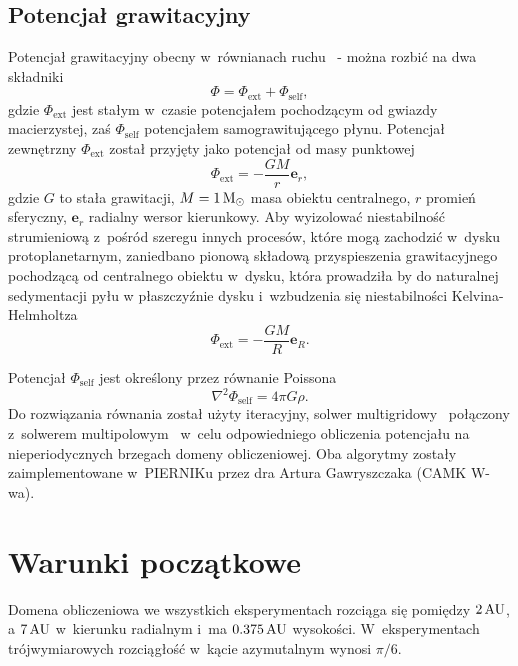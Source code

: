 \subsection{Potencjał grawitacyjny}
Potencjał grawitacyjny obecny w~równianach ruchu~ -  można
rozbić na dwa składniki
\begin{equation}
   \Phi = \Phi_{\textrm{ext}} + \Phi_{\textrm{self}},
\end{equation}
gdzie $\Phi_{\textrm{ext}}$ jest stałym w~czasie potencjałem pochodzącym od
gwiazdy macierzystej, zaś $\Phi_{\textrm{self}}$ potencjałem samograwitującego
płynu. Potencjał zewnętrzny $\Phi_{\textrm{ext}}$ został przyjęty jako potencjał
od masy punktowej
\begin{equation}
   \Phi_{\textrm{ext}} = -\frac{GM}{r} \mathbf{e}_r,
\end{equation}
gdzie $G$ to stała grawitacji, $M = 1\hbox{$\mathrm{\thinspace M_{\odot}}$}$ masa obiektu centralnego, $r$
promień sferyczny, $\mathbf{e}_r$ radialny wersor kierunkowy.
Aby wyizolować niestabilność strumieniową z~pośród
szeregu innych procesów, które mogą zachodzić w~dysku protoplanetarnym,
zaniedbano pionową składową przyspieszenia grawitacyjnego pochodzącą od
centralnego obiektu w~dysku, która prowadziła by do naturalnej sedymentacji pyłu
w płaszczyźnie dysku i~wzbudzenia się niestabilności
Kelvina-Helmholtza~\cite{JHK06}
\begin{equation}\label{eq:phiext}
   \Phi_{\textrm{ext}} = -\frac{GM}{R} \mathbf{e}_R.
\end{equation}

\par Potencjał $\Phi_{\textrm{self}}$ jest określony przez równanie Poissona
\begin{equation}\label{eq:poisson}
   \nabla^2 \Phi_{\textrm{self}} = 4\pi G \rho.
\end{equation}
Do rozwiązania równania  został użyty iteracyjny, solwer
multigridowy~\citep{HG00} połączony z~solwerem multipolowym~\citep{J77} w~celu
odpowiedniego obliczenia potencjału na nieperiodycznych brzegach domeny
obliczeniowej. Oba algorytmy zostały zaimplementowane w~PIERNIKu przez dra
Artura Gawryszczaka (CAMK W-wa).

\section{Warunki początkowe}
Domena obliczeniowa we wszystkich eksperymentach rozciąga się pomiędzy $2\hbox{$\thinspace\textrm{AU}$}$, a
$7\hbox{$\thinspace\textrm{AU}$}$ w~kierunku radialnym i~ma $0.375\hbox{$\thinspace\textrm{AU}$}$ wysokości. W~eksperymentach
trójwymiarowych rozciągłość w~kącie azymutalnym wynosi $\pi / 6$.

